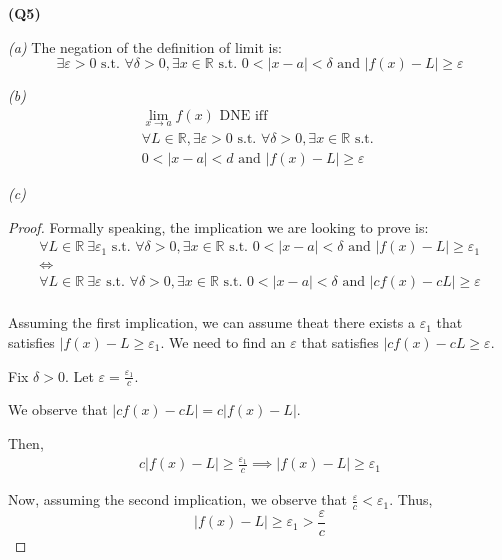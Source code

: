 \documentclass[12pt, a4paper]{article}
\renewcommand{\epsilon}{\varepsilon}
\newcommand{\displim}[1]{\displaystyle{\lim_{#1}}}
\newcommand{\st}{\text{ s.t. }}
\newcommand{\R}{\mathbb{R}}
\begin{document}
\textbf{(Q5)}

\textit{(a)}
The negation of the definition of limit is:
\[
    \exists \epsilon > 0 \text{ s.t. } \forall \delta > 0, \exists x \in \R
    \text{ s.t. } 0 < |x - a| < \delta \text{ and } |f(x) - L| \geq \epsilon
\]

\textit{(b)}
\begin{gather*}
    \displim{x \to a} f(x) \text{ DNE iff}\\
    \forall L \in \R, \exists \epsilon > 0 \text{ s.t. }\forall \delta > 0, \exists
    x \in \R \text{ s.t. }\\
    0 < |x - a| < d \text{ and } |f(x) - L| \geq \epsilon
\end{gather*}

\textit{(c)}
\begin{proof}
    Formally speaking, the implication we are looking to prove is:
    \begin{gather*}
        \forall L \in \R\: \exists \epsilon_1 \st \forall \delta >0, \exists
        x \in \R \st 0 < |x - a| < \delta \text{ and } |f(x) - L| \geq \epsilon_1\\
        \iff\\
        \forall L \in \R\: \exists \epsilon \st \forall \delta >0, \exists
        x \in \R \st 0 < |x - a| < \delta \text{ and } |cf(x) - cL| \geq \epsilon\\
    \end{gather*}

    Assuming the first implication, we can assume theat there exists a $\epsilon_1$
    that satisfies $|f(x) - L \geq \epsilon_1$. We need to find an $\epsilon$ that
    satisfies $|cf(x) -cL \geq \epsilon$.

    Fix $\delta > 0$. Let $\epsilon = \frac{\epsilon_1}{c}$.

    We observe that $|cf(x) - cL| = c|f(x)- L|$.

    Then,
    \begin{gather*}
        c|f(x)- L| \geq \frac{\epsilon_1}{c} \implies |f(x) -L| \geq \epsilon_1
    \end{gather*}

    Now, assuming the second implication, we observe that 
    $\displaystyle{\frac{\epsilon}{c}} < \epsilon_1$. Thus,
    \[
        |f(x) - L| \geq \epsilon_1 > \frac{\epsilon}{c}
    \]
\end{proof}
\end{document}
